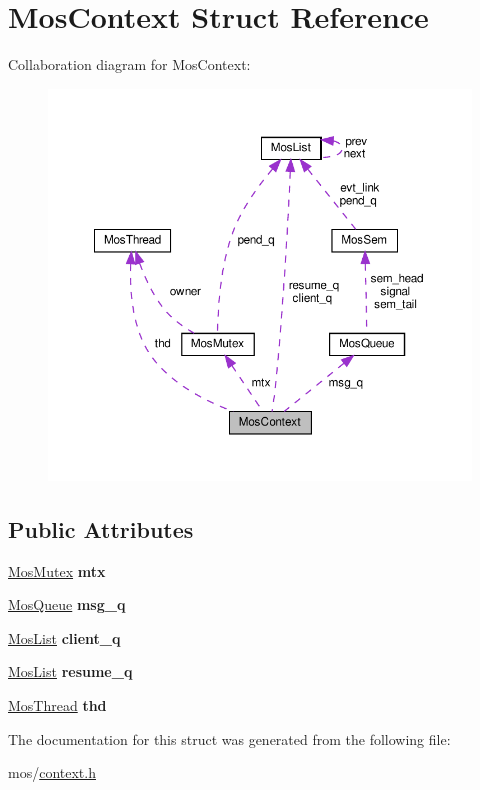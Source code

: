 \hypertarget{structMosContext}{}\section{Mos\+Context Struct Reference}
\label{structMosContext}


Collaboration diagram for Mos\+Context\+:\nopagebreak
\begin{figure}[H]
\begin{center}
\leavevmode
\includegraphics[width=350pt]{structMosContext__coll__graph}
\end{center}
\end{figure}
\subsection*{Public Attributes}
\begin{DoxyCompactItemize}
\item 
\mbox{\label{structMosContext_ab7a3499d1074e84cbbacd1d40ce41b3c}} 
\hyperlink{structMosMutex}{Mos\+Mutex} {\bfseries mtx}
\item 
\mbox{\label{structMosContext_a00fc0de27a8c397adee827e24c952a1b}} 
\hyperlink{structMosQueue}{Mos\+Queue} {\bfseries msg\+\_\+q}
\item 
\mbox{\label{structMosContext_a50bb20493f573489758cb3863b81a7d7}} 
\hyperlink{structMosList}{Mos\+List} {\bfseries client\+\_\+q}
\item 
\mbox{\label{structMosContext_a5631d32d11740ac71d1545d93cb0a35d}} 
\hyperlink{structMosList}{Mos\+List} {\bfseries resume\+\_\+q}
\item 
\mbox{\label{structMosContext_a0377077c08a9eeb45ad7279ea5753b72}} 
\hyperlink{structMosThread}{Mos\+Thread} {\bfseries thd}
\end{DoxyCompactItemize}


The documentation for this struct was generated from the following file\+:\begin{DoxyCompactItemize}
\item 
mos/\hyperlink{context_8h}{context.\+h}\end{DoxyCompactItemize}

